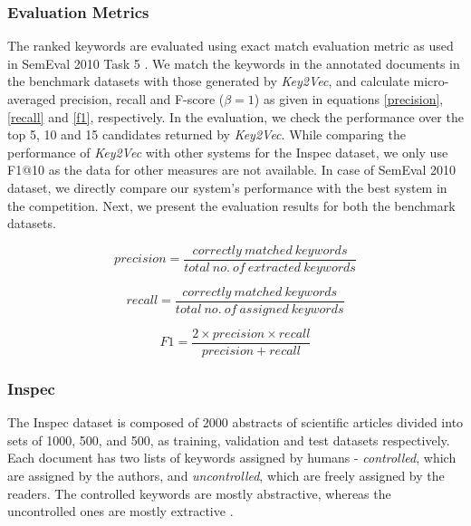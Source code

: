 \documentclass[conference]{IEEEtran}
\begin{document}
\subsubsection{Evaluation Metrics}
The ranked keywords are evaluated using exact match evaluation metric as used in SemEval 2010 Task 5 \cite{kim2010semeval}. We match the keywords in the annotated documents in the benchmark datasets with those generated by \textit{Key2Vec}, and calculate micro-averaged precision, recall and F-score ($\beta= 1$) as given in equations \ref{precision}, \ref{recall} and \ref{f1}, respectively. In the evaluation, we check the performance over the top 5, 10 and 15 candidates returned by \textit{Key2Vec}. While comparing the performance of \textit{Key2Vec} with other systems for the Inspec dataset, we only use F1@10 as the data for other measures are not available. In case of SemEval 2010 dataset, we directly compare our system's performance with the best system in the competition. Next, we present the evaluation results for both the benchmark datasets.

\begin{equation}
precision = \frac{correctly \ matched \ keywords}{total \ no. \ of \ extracted \ keywords}
\label{precision}
\end{equation}

\begin{equation}
recall = \frac{correctly \ matched \ keywords}{total \ no. \ of \ assigned \ keywords}
\label{recall}
\end{equation}

\begin{equation}
F1 = \frac{2\times precision\times recall}{precision + recall}
\label{f1}
\end{equation}



\subsubsection{Inspec \label{inspec}}
The Inspec dataset \cite{hulth2003improved} is composed of 2000 abstracts of scientific articles divided into sets of 1000, 500, and 500, as training, validation and test datasets respectively. Each document has two lists of keywords assigned by humans - \textit{controlled}, which are assigned by the authors, and \textit{uncontrolled}, which are freely assigned by the
readers. The controlled keywords are mostly abstractive, whereas the uncontrolled ones are mostly extractive \cite{wang2015using}. 
\end{document}
